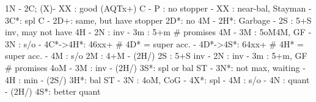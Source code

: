1N - 2C;
(X)- XX : good (AQTx+) C
   - P  : no stopper
        - XX : near-bal, Stayman
        - 3C*: spl C
   - 2D+: same, but have stopper
2D*: no 4M
   - 2H*: Garbage
   - 2S : 5+S inv, may not have 4H
   - 2N : inv
   - 3m : 5+m  # promises 4M
   - 3M : 5oM4M, GF
   - 3N : s/o
   - 4C*->4H*: 46xx+  # 4D* = super acc.
   - 4D*->4S*: 64xx+  # 4H* = super acc.
   - 4M : s/o
2M : 4+M
   - (2H/) 2S : 5+S inv
   - 2N : inv
   - 3m : 5+m, GF  # promises 4oM
   - 3M : inv
   - (2H/) 3S*: spl or bal ST
              - 3N*: not max, waiting
              - 4H : min
   - (2S/) 3H*: bal ST
   - 3N : 4oM, CoG
   - 4X*: spl
   - 4M : s/o
   - 4N : quant
   - (2H/) 4S*: better quant